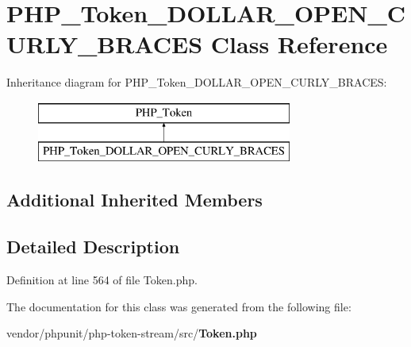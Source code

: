 \section{P\+H\+P\+\_\+\+Token\+\_\+\+D\+O\+L\+L\+A\+R\+\_\+\+O\+P\+E\+N\+\_\+\+C\+U\+R\+L\+Y\+\_\+\+B\+R\+A\+C\+E\+S Class Reference}
\label{class_p_h_p___token___d_o_l_l_a_r___o_p_e_n___c_u_r_l_y___b_r_a_c_e_s}
Inheritance diagram for P\+H\+P\+\_\+\+Token\+\_\+\+D\+O\+L\+L\+A\+R\+\_\+\+O\+P\+E\+N\+\_\+\+C\+U\+R\+L\+Y\+\_\+\+B\+R\+A\+C\+E\+S\+:\begin{figure}[H]
\begin{center}
\leavevmode
\includegraphics[height=2.000000cm]{class_p_h_p___token___d_o_l_l_a_r___o_p_e_n___c_u_r_l_y___b_r_a_c_e_s}
\end{center}
\end{figure}
\subsection*{Additional Inherited Members}


\subsection{Detailed Description}


Definition at line 564 of file Token.\+php.



The documentation for this class was generated from the following file\+:\begin{DoxyCompactItemize}
\item 
vendor/phpunit/php-\/token-\/stream/src/{\bf Token.\+php}\end{DoxyCompactItemize}
